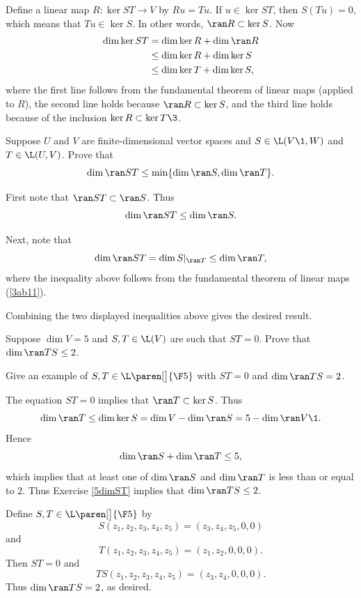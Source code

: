 \begin{Solution}
Define a linear map $R \colon \ker ST \to V$ by $Ru = Tu$.
If $u \in \ker ST$, then $S(Tu) = 0$, which means that \mbox{$Tu \in \ker S$}.  In
other words, $\ran R \subset \ker S$.  Now
\begin{align*}
\dim \ker ST &= \dim \ker R + \dim \ran R \\
& \le \dim \ker R + \dim \ker S \\
& \le \dim \ker T + \dim \ker S,
\end{align*}
where the first line follows from the fundamental theorem of linear maps (applied to $R$), the second line holds
because $\ran R \subset \ker S$, and the third line holds because of the inclusion $\ker R \subset \ker T\3$.
\end{Solution}

\exercise  \label{5dimST}
Suppose $U$ and $V$ are finite-dimensional vector spaces and
\mbox{$S \in \L(V\1, W)$} and $T \in \L(U, V)$.  Prove that
\[
\dim \ran ST \le \min \{\dim \ran S, \dim \ran T\}.
\]
\exercisedisplayend

\begin{Solution}
First note that $\ran ST \subset \ran S$. Thus
\[
\dim \ran ST \le \dim \ran S.
\]

Next, note that
\[
\dim \ran ST = \dim S|_{\ran T} \le \dim \ran T,
\]
where the inequality above follows from the fundamental theorem of linear maps (\ref{3ab11}).

Combining the two displayed inequalities above gives the desired result.
\end{Solution}

\exercise
\begin{SUBtheorem}
\item
Suppose $\dim V = 5$ and $S, T \in \L(V)$ are such that $ST = 0$. Prove that $\dim \ran TS \le 2$.
\item
Give an example of $S, T \in \L\paren[\big]{\F5}$ with $ST = 0$ and $\dim \ran TS = 2$.
\end{SUBtheorem}

\begin{Solution}
\begin{subtheorem}
\item
The equation $ST = 0$ implies that $\ran T \subset \ker S$. Thus
\[
\dim \ran T \le \dim \ker S = \dim V - \dim \ran S = 5 - \dim \ran V\1.
\]
Hence
\[
\dim \ran S + \dim \ran T \le 5,
\]
which implies that at least one of $\dim \ran S$ and $\dim \ran T$ is less than or equal to $2$. Thus Exercise \ref{5dimST} implies that $\dim \ran TS \le 2$.

\item
Define $S, T \in \L\paren[\big]{\F5}$ by
\[
S(z_1, z_2, z_3, z_4, z_5) = (z_3, z_4, z_5, 0, 0)
\]
and
\[
T(z_1, z_2, z_3, z_4, z_5) = (z_1, z_2,0, 0, 0).
\]
Then $ST = 0$ and
\[
TS(z_1, z_2, z_3, z_4, z_5) = (z_3, z_4, 0, 0, 0).
\]
Thus $\dim \ran TS = 2$, as desired.
\end{subtheorem}
\end{Solution}

